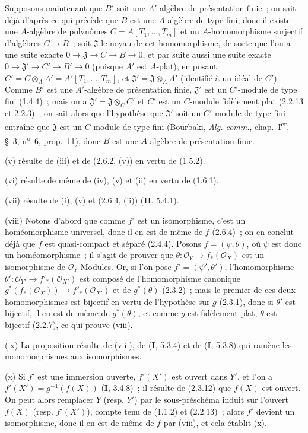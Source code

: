 Supposons maintenant que $B'$ soit une $A'$-algèbre de présentation finie~;
on sait déjà d'après ce qui précède que $B$ est une $A$-algèbre de type fini,
donc il existe une $A$-algèbre de polynômes
$C=A[T_1,\ldots,T_m]$ et un $A$-homomorphisme surjectif d'algèbres
$C\to B$~; soit $\mathfrak J$ le noyau de cet homomorphisme, de sorte que
l'on a une suite exacte
$0\to\mathfrak J\to C\to B\to0$,
et par suite aussi une suite exacte $0\to\mathfrak J'\to C'\to B'\to0$
(puisque $A'$ est $A$-plat), en posant
$C'=C\otimes_A A'=A'[T_1,\ldots,T_m]$, et
$\mathfrak J'=\mathfrak J\otimes_A A'$ (identifié à un idéal de $C'$).
Comme $B'$ est une $A'$-algèbre de présentation finie, $\mathfrak J'$ est un
$C'$-module de type fini (1.4.4)~; mais on a
$\mathfrak J'=\mathfrak J\otimes_C C'$ et $C'$ est un $C$-module fidèlement
plat (2.2.13 et 2.2.3)~; on sait alors que l'hypothèse que $\mathfrak J'$ soit
un $C'$-module de type fini entraîne que $\mathfrak J$ est un $C$-module de
type fini (Bourbaki, \emph{Alg. comm.}, chap.~I\textsuperscript{er}, \S~3,
n\textsuperscript{o}~6, prop.~11), donc $B$ est une $A$-algèbre de
présentation finie.

(v) résulte de (iii) et de (2.6.2, (v)) en vertu de (1.5.2).

(vi) résulte de même de (iv), (v) et (ii) en vertu de (1.6.1).

(vii) résulte de (i), (v) et (2.6.4, (ii)) (\textbf{II}, 5.4.1).

(viii) Notons d'abord que comme $f'$ est un isomorphisme, c'est un
homéomorphisme universel, donc il en est de même de $f$ (2.6.4)~; on en
conclut déjà que $f$ est quasi-compact et séparé (2.4.4). Posons
$f=(\psi,\theta)$, où $\psi$ est donc un homéomorphisme~; il s'agit de
prouver que
$\theta:\mathcal O_Y\to f_*(\mathcal O_X)$
est un isomorphisme de $\mathcal O_Y$-Modules. Or, si l'on pose
$f'=(\psi',\theta')$, l'homomorphisme
$\theta':\mathcal O_{Y'}\to f'_*(\mathcal O_{X'})$ est composé de
l'homomorphisme canonique
$g^*(f_*(\mathcal O_X))\to f'_*(\mathcal O_{X'})$ et de $g^*(\theta)$
(2.3.2)~; mais le premier de ces deux homomorphismes est bijectif en vertu de
l'hypothèse sur $g$ (2.3.1), donc si $\theta'$ est bijectif,
il en est de même de $g^*(\theta)$, et comme $g$ est fidèlement plat,
$\theta$ est bijectif (2.2.7), ce qui prouve (viii).

(ix) La proposition résulte de (viii), de (\textbf{I}, 5.3.4) et de (\textbf{I}, 5.3.8)
qui ramène les monomorphismes aux isomorphismes.

(x) Si $f'$ est une immersion ouverte, $f'(X')$ est ouvert dans $Y'$,
et l'on a $f'(X')=g^{-1}(f(X))$ (\textbf{I}, 3.4.8)~; il résulte de (2.3.12) que
$f(X)$ est ouvert. On peut alors remplacer $Y$ (resp. $Y'$) par le
sous-préschéma induit sur l'ouvert $f(X)$ (resp. $f'(X')$), compte tenu de
(1.1.2) et (2.2.13)~; alors $f'$ devient un isomorphisme, donc il en est de
même de $f$ par (viii), et cela établit (x).

